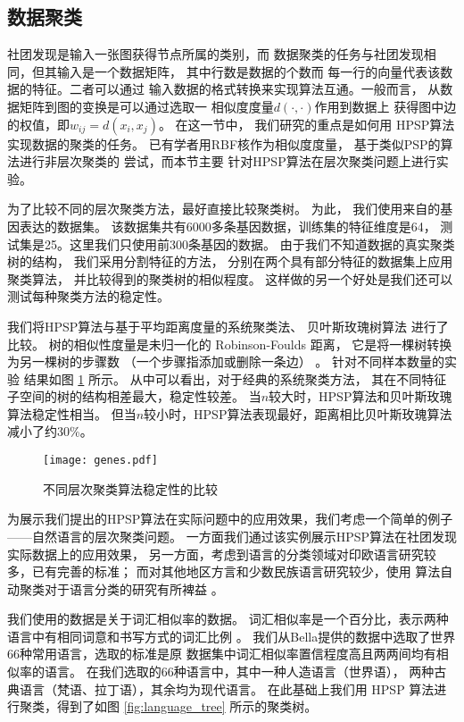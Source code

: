 \subsection{数据聚类}
\label{sec:data_clustering}
社团发现是输入一张图获得节点所属的类别，而
数据聚类的任务与社团发现相同，但其输入是一个数据矩阵，
其中行数是数据的个数而
每一行的向量代表该数据的特征。二者可以通过
输入数据的格式转换来实现算法互通。一般而言，
从数据矩阵到图的变换是可以通过选取一
相似度度量$d(\cdot,\cdot)$作用到数据上
获得图中边的权值，即$w_{ij}=d(x_i, x_j)$。
在这一节中，
我们研究的重点是如何用
HPSP算法 实现数据的聚类的任务。
已有学者用RBF核作为相似度度量，
基于类似PSP的算法进行非层次聚类的
尝试\cite{mac}，而本节主要
针对HPSP算法在层次聚类问题上进行实验。

为了比较不同的层次聚类方法，最好直接比较聚类树。
为此，
我们使用来自\citet{khan2001classification}的基因表达的数据集。
该数据集共有6000多条基因数据，训练集的特征维度是64，
测试集是25。这里我们只使用前300条基因的数据。
由于我们不知道数据的真实聚类树的结构，
我们采用分割特征的方法，
分别在两个具有部分特征的数据集上应用聚类算法，
并比较得到的聚类树的相似程度。
这样做的另一个好处是我们还可以测试每种聚类方法的稳定性。

我们将HPSP算法与基于平均距离度量的系统聚类法、
贝叶斯玫瑰树算法
\cite{blundell2011discovering}
进行了比较。
树的相似性度量是未归一化的 Robinson-Foulds 距离，
它是将一棵树转换为另一棵树的步骤数
（一个步骤指添加或删除一条边）
\citep{day1985optimal}。
针对不同样本数量的实验
结果如图 \ref{fig:shc} 所示。
从中可以看出，对于经典的系统聚类方法，
其在不同特征子空间的树的结构相差最大，稳定性较差。
当$n$较大时，HPSP算法和贝叶斯玫瑰算法稳定性相当。
但当$n$较小时，HPSP算法表现最好，距离相比贝叶斯玫瑰算法减小了约30\%。

\begin{figure}[!ht]
\centering
\texttt{[image: genes.pdf]}
\caption{不同层次聚类算法稳定性的比较}\label{fig:shc}
\end{figure}

为展示我们提出的HPSP算法在实际问题中的应用效果，我们考虑一个简单的例子——自然语言的层次聚类问题。
一方面我们通过该实例展示HPSP算法在社团发现实际数据上的应用效果，
另一方面，考虑到语言的分类领域对印欧语言研究较多，已有完善的标准；
而对其他地区方言和少数民族语言研究较少，使用
算法自动聚类对于语言分类的研究有所裨益 \cite{nasution2019visualizing}。

我们使用的数据是关于词汇相似率的数据。
词汇相似率是一个百分比，表示两种语言中有相同词意和书写方式的词汇比例
\cite{bella2021database}。
我们从Bella提供的数据中选取了世界66种常用语言，选取的标准是原
数据集中词汇相似率置信程度高且两两间均有相似率的语言。
在我们选取的66种语言中，其中一种人造语言（世界语），
两种古典语言（梵语、拉丁语），其余均为现代语言。
在此基础上我们用 HPSP 算法进行聚类，得到了如图 \ref{fig:language_tree} 所示的聚类树。

